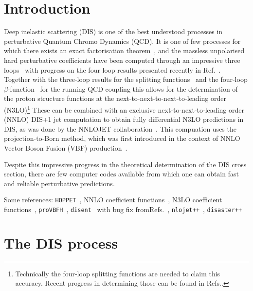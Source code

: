 \documentclass[submission, PhysCodeb]{SciPost}
\newcommand{\hoppet}{{\tt HOPPET}}
\newcommand{\disent}{{\tt disent}}
\newcommand{\provbfh}{{\tt proVBFH}}
\newcommand{\disaster}{{\tt disaster++}}
\newcommand{\nlojet}{{\tt nlojet++}}
\begin{document}
\section{Introduction}
\label{sec:intro}
Deep inelastic scattering (DIS) is one of the best understood
processes in perturbative Quantum Chromo Dynamics (QCD). It is one of
few processes for which there exists an exact factorisation
theorem~\cite{Collins:1987pm,Collins:1989gx}, and the massless
unpolarised hard perturbative coefficients have been computed through
an impressive three
loops~\cite{SanchezGuillen:1990iq,vanNeerven:1991nn,Zijlstra:1992qd,Zijlstra:1992kj,vanNeerven:1999ca,vanNeerven:2000uj,Moch:1999eb,Moch:2004xu,Vermaseren:2005qc,Vogt:2006bt,Moch:2007rq,Davies:2016ruz}
with progress on the four loop results presented recently in
Ref.~\cite{Moch:2022frw}. Together with the three-loop results for the
splitting functions~\cite{Moch:2004pa,Vogt:2004mw} and the four-loop
$\beta$-function~\cite{vanRitbergen:1997va,Czakon:2004bu} for the
running QCD coupling this allows for the determination of the proton
structure functions at the next-to-next-to-next-to-leading order
(N3LO)\footnote{Technically the four-loop splitting functions are
needed to claim this accuracy. Recent progress in determining those
can be found in
Refs.\cite{Moch:2021qrk,Falcioni:2023luc,Falcioni:2023vqq,Gehrmann:2023cqm}.}
These can be combined with an exclusive next-to-next-to-leading order
(NNLO) DIS+1 jet computation to obtain fully differential N3LO
predictions in DIS, as was done by the NNLOJET
collaboration~\cite{Currie:2018fgr,Gehrmann:2018odt}. This compuation
uses the projection-to-Born method, which was first introduced in the
context of NNLO Vector Boson Fusion (VBF)
production~\cite{Cacciari:2015jma}.

Despite this impressive progress in the theoretical determination of
the DIS cross section, there are few computer codes available from
which one can obtain fast and reliable perturbative predictions. 



Some references: \hoppet{}~\cite{Salam:2008qg}, NNLO coefficient
functions~\cite{vanNeerven:1999ca,vanNeerven:2000uj}, N3LO coefficient
functions~\cite{Moch:2004xu,Vermaseren:2005qc,Moch:2008fj,Davies:2016ruz},
\provbfh{}~\cite{Cacciari:2015jma}, \disent{}~\cite{Catani:1996vz}
with bug fix fromRefs.~\cite{Borsa:2020ulb,Borsa:2020yxh},
\nlojet{}~\cite{Nagy:2001xb}, \disaster{}~\cite{Graudenz:1997gv}

\section{The DIS process}
\label{sed:dis}
\end{document}
